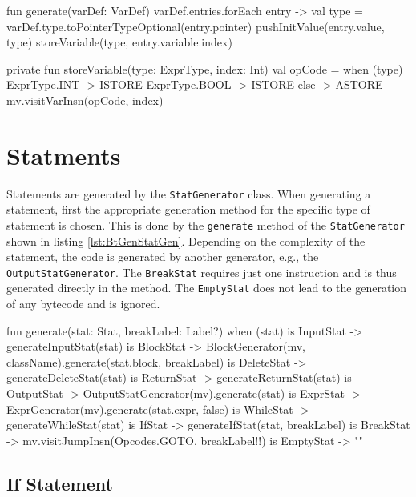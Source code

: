 \begin{KotlinCode}[float,numbers=none,caption=Code for the definition of local variables., label=lst:BtGenVarDef]
fun generate(varDef: VarDef) {
    varDef.entries.forEach { entry ->
        val type = varDef.type.toPointerTypeOptional(entry.pointer)
        pushInitValue(entry.value, type)
        storeVariable(type, entry.variable.index)
    }
}

private fun storeVariable(type: ExprType, index: Int) {
    val opCode = when (type) {
        ExprType.INT  -> ISTORE
        ExprType.BOOL -> ISTORE
        else          -> ASTORE
    }
    mv.visitVarInsn(opCode, index)
}
\end{KotlinCode}

\section{Statments}

Statements are generated by the \verb|StatGenerator| class. When generating a statement, first the appropriate generation method for the specific type of statement is chosen. This is done by the \verb|generate| method of the \verb|StatGenerator| shown in listing \ref{lst:BtGenStatGen}. Depending on the complexity of the statement, the code is generated by another generator, e.g., the \verb|OutputStatGenerator|. The \verb|BreakStat| requires just one instruction and is thus generated directly in the method. The \verb|EmptyStat| does not lead to the generation of any bytecode and is ignored. 

\begin{KotlinCode}[float,numbers=none,caption=Implementation of the \texttt{generate} method of the \texttt{StatGenerator}., label=lst:BtGenStatGen]
fun generate(stat: Stat, breakLabel: Label?) {
    when (stat) {
        is InputStat -> generateInputStat(stat)
        is BlockStat -> BlockGenerator(mv, className).generate(stat.block, breakLabel)
        is DeleteStat -> generateDeleteStat(stat)
        is ReturnStat -> generateReturnStat(stat)
        is OutputStat -> OutputStatGenerator(mv).generate(stat)
        is ExprStat -> ExprGenerator(mv).generate(stat.expr, false)
        is WhileStat -> generateWhileStat(stat)
        is IfStat -> generateIfStat(stat, breakLabel)
        is BreakStat -> mv.visitJumpInsn(Opcodes.GOTO, breakLabel!!)
        is EmptyStat -> ""
    }
}
\end{KotlinCode}

\subsection{If Statement}


